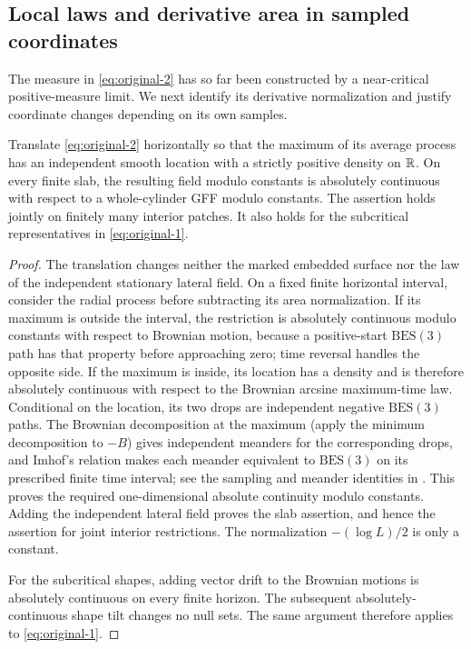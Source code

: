 \subsection{Local laws and derivative area in sampled coordinates}
\label{cont:local-laws-section}

The measure in \eqref{eq:original-2} has so far been constructed by a
near-critical positive-measure limit.  We next identify its derivative
normalization and justify coordinate changes depending on its own samples.

\begin{lemma}\label{cont:slab-ac}
Translate \eqref{eq:original-2} horizontally so that the maximum of its
average process has an independent smooth location with a strictly positive
density on $\mathbb R$.  On every finite slab, the resulting field modulo constants
is absolutely continuous with respect to a whole-cylinder GFF modulo
constants.  The assertion holds jointly on finitely many interior patches.
It also holds for the subcritical representatives in
\eqref{eq:original-1}.
\end{lemma}

\begin{proof}
The translation changes neither the marked embedded surface nor the law of
the independent stationary lateral field.  On a fixed finite horizontal
interval, consider the radial process before subtracting its area
normalization.  If its maximum is outside the interval, the restriction is
absolutely continuous modulo constants with respect to Brownian motion,
because a positive-start $\mathrm{BES}(3)$ path has that property before
approaching zero; time reversal handles the opposite side.  If the maximum
is inside, its location has a density and is therefore absolutely continuous
with respect to the Brownian arcsine maximum-time law.  Conditional on the
location, its two drops are independent negative $\mathrm{BES}(3)$ paths.
The Brownian decomposition at the maximum (apply the minimum decomposition
to $-B$) gives independent meanders for the corresponding drops, and Imhof's relation makes each meander equivalent
to $\mathrm{BES}(3)$ on its prescribed finite time interval; see the sampling
and meander identities in \cite[Corollary~5 and Equations~(5)--(6)]{PitmanMeanders}.  This proves the required
one-dimensional absolute continuity modulo constants.  Adding the independent
lateral field proves the slab assertion, and hence the assertion for joint
interior restrictions.  The normalization $-(\log L)/2$ is only a constant.

For the subcritical shapes, adding vector drift to the Brownian motions is
absolutely continuous on every finite horizon.  The subsequent
absolutely-continuous shape tilt changes no null sets.  The same argument
therefore applies to \eqref{eq:original-1}.
\end{proof}

